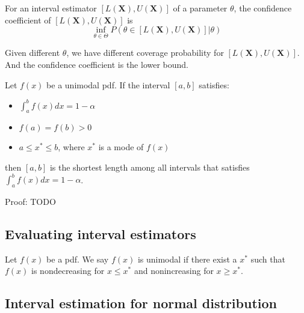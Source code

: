 \begin{refsection}
\begin{definition}
	\cite[418]{casella2002statistical} For an interval estimator $[L(\bm{X}),U(\bm{X})]$ of a parameter $\theta$, the confidence coefficient of $[L(\bm{X}),U(\bm{X})]$ is
	$$\inf_{\theta\in\Theta} P(\theta\in [L(\bm{X}),U(\bm{X})]|\theta)$$
\end{definition}

\begin{remark}
	Given different $\theta$, we have different coverage probability for $[L(\bm{X}),U(\bm{X})]$. And the confidence coefficient is the lower bound. 
\end{remark}

\begin{theorem}
	\cite[441]{casella2002statistical} Let $f(x)$ be a unimodal pdf. If the interval $[a,b]$ satisfies:
	\begin{itemize}
		\item $\int_a^b f(x)dx = 1-\alpha$
		\item $f(a)=f(b) > 0$
		\item $a\leq x^* \leq b$, where $x^*$ is a mode of $f(x)$
	\end{itemize}
	then $[a,b]$ is the shortest length among all intervals that satisfies $\int_a^b f(x)dx = 1-\alpha$.
\end{theorem}
Proof: TODO

\subsection{Evaluating interval estimators}
\begin{definition}
	Let $f(x)$ be a pdf. We say $f(x)$ is unimodal if there exist a $x^*$ such that $f(x)$ is nondecreasing for $x\leq x^*$ and nonincreasing for $x \geq x^*$.
\end{definition}


\subsection{Interval estimation for normal distribution}




\end{refsection}
